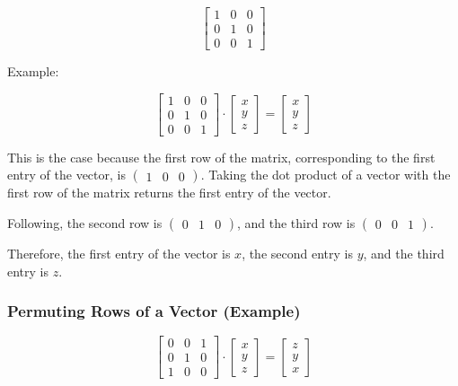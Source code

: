 \documentclass[12pt]{article}
\begin{document}
\begin{equation}
  \begin{bmatrix}
    1 & 0 & 0 \\
    0 & 1 & 0 \\
    0 & 0 & 1
  \end{bmatrix}
\end{equation}

Example:

\begin{equation}
  \begin{bmatrix}
    1 & 0 & 0 \\
    0 & 1 & 0 \\
    0 & 0 & 1
  \end{bmatrix}
  \cdot
  \begin{bmatrix}
    x \\ y \\ z
  \end{bmatrix}
  =
  \begin{bmatrix}
    x \\ y \\ z
  \end{bmatrix}
\end{equation}

This is the case because the first row of the matrix, corresponding to the first
entry of the vector, is $\begin{pmatrix} 1 & 0 & 0 \end{pmatrix}$. 
Taking the dot product of a vector with the first row of the matrix returns
the first entry of the vector.

Following, the second row is $\begin{pmatrix} 0 & 1 & 0 \end{pmatrix}$,
and the third row is $\begin{pmatrix} 0 & 0 & 1 \end{pmatrix}$.

Therefore, the first entry of the vector is $x$, the second entry is $y$,
and the third entry is $z$.

\subsubsection{Permuting Rows of a Vector (Example)}

\begin{equation}
  \begin{bmatrix}
    0 & 0 & 1 \\
    0 & 1 & 0 \\
    1 & 0 & 0
  \end{bmatrix}
  \cdot
  \begin{bmatrix}
    x \\ y \\ z
  \end{bmatrix}
  =
  \begin{bmatrix}
    z \\ y \\ x
  \end{bmatrix}
\end{equation}
\end{document}

